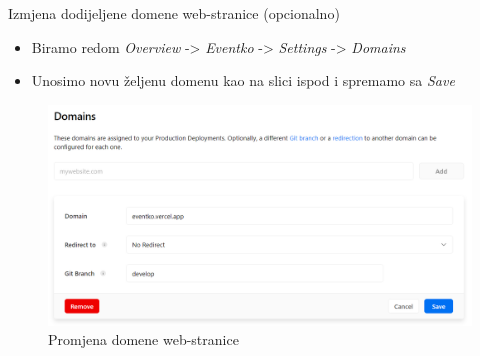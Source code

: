 \begin{packed_enum}
				\item Izmjena dodijeljene domene web-stranice (opcionalno)
				\begin{itemize}
					\item Biramo redom \textit{Overview} -> \textit{Eventko} -> \textit{Settings} -> \textit{Domains}
					\item Unosimo novu željenu domenu kao na slici ispod i spremamo sa \textit{Save}
				\end{itemize}
				\begin{figure}[H]
					\includegraphics[width=\textwidth]{Opis deploymenta/Slika10.png}
					\caption{Promjena domene web-stranice}
				\end{figure}
			\end{packed_enum}
			
			\eject